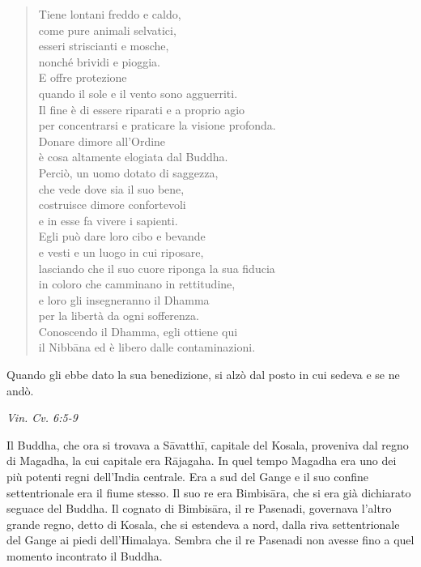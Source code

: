 \begin{quote}
Tiene lontani freddo e caldo, \\
come pure animali selvatici, \\
esseri striscianti e mosche, \\
nonché brividi e pioggia. \\
E offre protezione \\
quando il sole e il vento sono agguerriti. \\
Il fine è di essere riparati e a proprio agio \\
per concentrarsi e praticare la visione profonda. \\
Donare dimore all’Ordine \\
è cosa altamente elogiata dal Buddha. \\
Perciò, un uomo dotato di saggezza, \\
che vede dove sia il suo bene, \\
costruisce dimore confortevoli \\
e in esse fa vivere i sapienti. \\
Egli può dare loro cibo e bevande \\
e vesti e un luogo in cui riposare, \\
lasciando che il suo cuore riponga la sua fiducia \\
in coloro che camminano in rettitudine, \\
e loro gli insegneranno il Dhamma \\
per la libertà da ogni sofferenza. \\
Conoscendo il Dhamma, egli ottiene qui \\
il Nibbāna ed è libero dalle contaminazioni.
\end{quote}

Quando gli ebbe dato la sua benedizione, si alzò dal posto in cui sedeva
e se ne andò.


\emph{Vin. Cv. 6:5-9}


 Il Buddha, che ora si trovava a Sāvatthī, capitale del
Kosala, proveniva dal regno di Magadha, la cui capitale era Rājagaha. In
quel tempo Magadha era uno dei più potenti regni dell’India centrale.
Era a sud del Gange e il suo confine settentrionale era il fiume stesso.
Il suo re era Bimbisāra, che si era già dichiarato seguace del Buddha.
Il cognato di Bimbisāra, il re Pasenadi, governava l’altro grande regno,
detto di Kosala, che si estendeva a nord, dalla riva settentrionale del
Gange ai piedi dell’Himalaya. Sembra che il re Pasenadi non avesse fino
a quel momento incontrato il Buddha.


